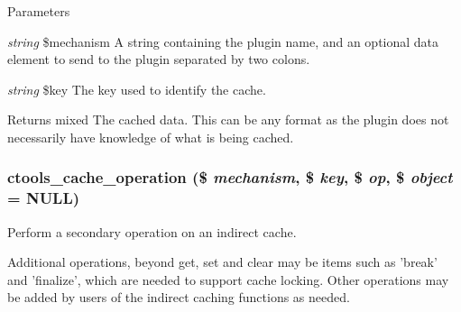 \begin{DoxyParams}{Parameters}
\item[{\em string}]\$mechanism A string containing the plugin name, and an optional data element to send to the plugin separated by two colons.\item[{\em string}]\$key The key used to identify the cache.\end{DoxyParams}
\begin{DoxyReturn}{Returns}
mixed The cached data. This can be any format as the plugin does not necessarily have knowledge of what is being cached. 
\end{DoxyReturn}
\hypertarget{ctools_2includes_2cache_8inc_aaa68caf3223df01f8a019a10a7f5cbd9}{
\subsubsection[{ctools\_\-cache\_\-operation}]{\setlength{\rightskip}{0pt plus 5cm}ctools\_\-cache\_\-operation (\$ {\em mechanism}, \/  \$ {\em key}, \/  \$ {\em op}, \/  \$ {\em object} = {\ttfamily NULL})}}
\label{ctools_2includes_2cache_8inc_aaa68caf3223df01f8a019a10a7f5cbd9}
Perform a secondary operation on an indirect cache.

Additional operations, beyond get, set and clear may be items such as 'break' and 'finalize', which are needed to support cache locking. Other operations may be added by users of the indirect caching functions as needed.


